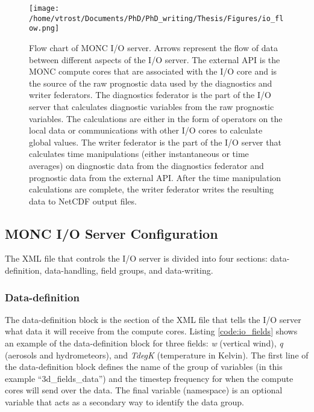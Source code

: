 \begin{figure}[H]
	\centering
	\texttt{[image: /home/vtrost/Documents/PhD/PhD\_writing/Thesis/Figures/io\_flow.png]}
	\caption{Flow chart of MONC I/O server. Arrows represent the flow of data between different aspects of the I/O server. The external API is the MONC compute cores that are associated with the I/O core and is the source of the raw prognostic data used by the diagnostics and writer federators. The diagnostics federator is the part of the I/O server that calculates diagnostic variables from the raw prognostic variables. The calculations are either in the form of operators on the local data or communications with other I/O cores to calculate global values. The writer federator is the part of the I/O server that calculates time manipulations (either instantaneous or time averages) on diagnostic data from the diagnostics federator and prognostic data from the external API. After the time manipulation calculations are complete, the writer federator writes the resulting data to NetCDF output files. \citep[][Figure 2]{brown2018}}
	\label{fig:io_flow}
\end{figure}
\newpage
\subsection{MONC I/O Server Configuration}
The XML file that controls the I/O server is divided into four sections: data-definition, data-handling, field groups, and data-writing.

\subsubsection{Data-definition}
The data-definition block is the section of the XML file that tells the I/O server what data it will receive from the compute cores. Listing \ref{code:io_fields} shows an example of the data-definition block for three fields: \textit{w} (vertical wind), \textit{q} (aerosols and hydrometeors), and \textit{TdegK} (temperature in Kelvin). The first line of the data-definition block defines the name of the group of variables (in this example ``3d\_fields\_data'') and the timestep frequency for when the compute cores will send over the data. The final variable (namespace) is an optional variable that acts as a secondary way to identify the data group. \citep{brown2018, moncCode}

